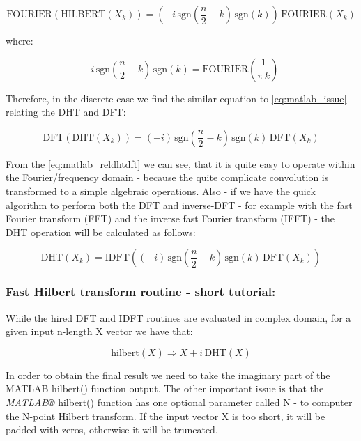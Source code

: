 \documentclass[12pt,twoside,a4paper]{article}
\numberwithin{equation}{subsection}
\numberwithin{figure}{subsection}
\begin{document}
\begin{equation} \label{eq:matlab_issue}
  \mathrm{FOURIER}(\mathrm{HILBERT}({X_{k}}))=( - i\,\mathrm{sgn}( \frac {n}{2} - k)\,\mathrm{sgn}(k))\,\mathrm{FOURIER}({X_{k}})
\end{equation}

where:

\begin{equation} \label{eq:matlab_kernel}
   - i\,\mathrm{sgn}(\frac {n}{2} - k)\,\mathrm{sgn}(k)=\mathrm{FOURIER}(\frac {1}{\pi \,k})
\end{equation}

Therefore, in the discrete case we find the similar equation to \ref{eq:matlab_issue} relating the DHT and DFT:

\begin{equation} \label{eq:matlab_reldhtdft}
  \mathrm{DFT}(\mathrm{DHT}({X_{k}}))=( - i)\,\mathrm{sgn}(\frac {n}{2} - k)\,\mathrm{sgn}(k)\,\mathrm{DFT}({X_{k}})
\end{equation}

From the \ref{eq:matlab_reldhtdft} we can see, that it is quite easy to operate within the Fourier/frequency domain - because the
quite complicate convolution is transformed to a simple algebraic operations. Also - if we have the quick algorithm to perform both
the DFT and inverse-DFT - for example with the fast Fourier transform (FFT) and the inverse fast Fourier transform (IFFT) - the DHT
operation will be calculated as follows:

\begin{equation} \label{eq:matlab_fulldhthdf}
  \mathrm{DHT}({X_{k}})=\mathrm{IDFT}(( - i)\,\mathrm{sgn}(\frac {n}{2} - k)\,\mathrm{sgn}(k)\,\mathrm{DFT}({X_{k}}))
\end{equation}

\subsubsection*{Fast Hilbert transform routine - short tutorial:}

While the hired DFT and IDFT routines are evaluated in complex domain, for a given input n-length X vector we have that:

\begin{equation} \label{eq:matlab_implication}
  \mathrm{hilbert}(X) \Rightarrow X + i\,\mathrm{DHT}(X)
\end{equation}

In order to obtain the final result we need to take the imaginary part of the MATLAB hilbert() function output. The other
important issue is that the \textit{MATLAB®} hilbert() function has one optional parameter called N - to computer the N-point
Hilbert transform. If the input vector X is too short, it will be padded with zeros, otherwise it will be truncated. 
\end{document}
